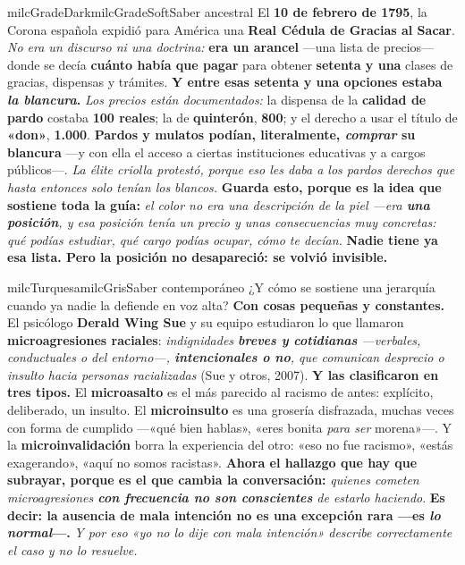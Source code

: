 \documentclass[11pt,letterpaper]{article}
\begin{document}
\begin{softbox}{milcGradeDark}{milcGradeSoft}{Saber ancestral}
El \textbf{10 de febrero de 1795}, la Corona española expidió para América una \textbf{Real Cédula de Gracias al Sacar}. \emph{No era un discurso ni una doctrina:} \textbf{era un arancel} ---una lista de precios--- donde se decía \textbf{cuánto había que pagar} para obtener \textbf{setenta y una} clases de gracias, dispensas y trámites. \textbf{Y entre esas setenta y una opciones estaba \emph{la blancura}.} \emph{Los precios están documentados:} la dispensa de la \textbf{calidad de pardo} costaba \textbf{100 reales}; la de \textbf{quinterón}, \textbf{800}; y el derecho a usar el título de \textbf{«don»}, \textbf{1.000}. \textbf{Pardos y mulatos podían, literalmente, \emph{comprar} su blancura} ---y con ella el acceso a ciertas instituciones educativas y a cargos públicos---. \emph{La élite criolla protestó, porque eso les daba a los pardos derechos que hasta entonces solo tenían los blancos.} \textbf{Guarda esto, porque es la idea que sostiene toda la guía:} \emph{el color no era una descripción de la piel ---era \textbf{una posición}, y esa posición tenía un precio y unas consecuencias muy concretas: qué podías estudiar, qué cargo podías ocupar, cómo te decían.} \textbf{Nadie tiene ya esa lista. Pero la posición no desapareció: se volvió invisible.}
\end{softbox}

\begin{softbox}{milcTurquesa}{milcGris}{Saber contemporáneo}
¿Y cómo se sostiene una jerarquía cuando ya nadie la defiende en voz alta? \textbf{Con cosas pequeñas y constantes.} El psicólogo \textbf{Derald Wing Sue} y su equipo estudiaron lo que llamaron \textbf{microagresiones raciales}: \emph{indignidades \textbf{breves y cotidianas} ---verbales, conductuales o del entorno---, \textbf{intencionales o no}, que comunican desprecio o insulto hacia personas racializadas} (Sue y otros, 2007). \textbf{Y las clasificaron en tres tipos.} El \textbf{microasalto} es el más parecido al racismo de antes: explícito, deliberado, un insulto. El \textbf{microinsulto} es una grosería disfrazada, muchas veces con forma de cumplido ---«qué bien hablas», «eres bonita \emph{para ser} morena»---. Y la \textbf{microinvalidación} borra la experiencia del otro: «eso no fue racismo», «estás exagerando», «aquí no somos racistas». \textbf{Ahora el hallazgo que hay que subrayar, porque es el que cambia la conversación:} \emph{quienes cometen microagresiones \textbf{con frecuencia no son conscientes} de estarlo haciendo}. \textbf{Es decir: la ausencia de mala intención no es una excepción rara ---es \emph{lo normal}---.} \emph{Y por eso «yo no lo dije con mala intención» describe correctamente el caso y no lo resuelve.}
\end{softbox}
\end{document}
